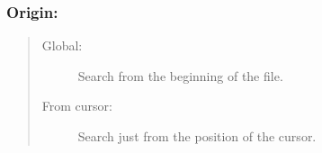 \subsubsection{Origin:}
\begin{quote}
  \begin{footnotesize}
    \begin{description}
      \item[Global:]
        Search from the beginning of the file.
      \item[From cursor:]
        Search just from the position of the cursor.
    \end{description}
  \end{footnotesize}
\end{quote}
